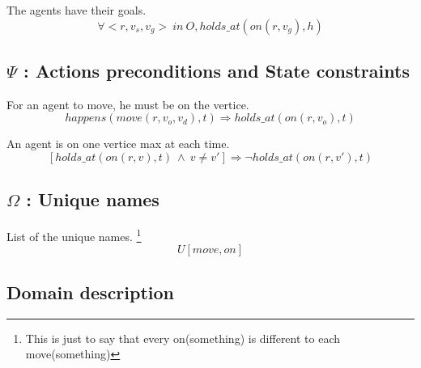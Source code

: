 The agents have their goals.
\begin{equation}
  \tag{$\Gamma_f$}
  \forall <r,v_s,v_g>\ in\ O,holds\_at(on(r,v_g),h)
\end{equation}

\subsection{$\Psi$ : Actions preconditions and State constraints}

For an agent to move, he must be on the vertice.
\begin{equation}
  \tag{$\Psi$.1}
  happens(move(r,v_o,v_d),t) \Rightarrow holds\_at(on(r,v_o),t)
\end{equation}

An agent is on one vertice max at each time.
\begin{equation}
  \tag{$\Psi$.2}
  [holds\_at(on(r,v),t)\ \land\ v\neq v']\Rightarrow \neg holds\_at(on(r,v'),t)
\end{equation}

\iffalse
A vertice has place for one agent only at each time.
\begin{equation}
  \tag{$\Psi$.3}
  [holds\_at(on(r,v),t)\ \land\ r\neq r']\Rightarrow \neg holds\_at(on(r',v),t)
\end{equation}
\fi

\iffalse
Agents cannot switch places
\begin{multline}
  \tag{$\Psi$.4}
  [holds\_at(on(r,v),t)\ \land\ holds\_at(on(r',v'),t)\ \land\ holds\_at(on(r',v),t+1) \\ \land\ v\neq v'\ \land\ r\neq r'] \Rightarrow \neg holds\_at(on(r,v'),t+1)
\end{multline}
\fi

\subsection{$\Omega$ : Unique names}

List of the unique names. \footnote{This is just to say that every on(something) is different to each move(something)}
\begin{equation}
  \tag{$\Omega$}
  U[move,on]
\end{equation}

\subsection{Domain description}

